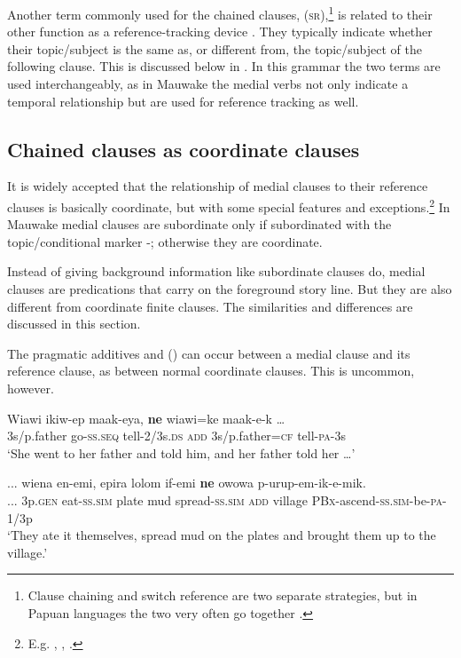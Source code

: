 Another term commonly used for the chained clauses,  (\textsc{sr}),\footnote{Clause chaining and switch reference are two separate strategies, but in Papuan languages the two very often  go together \citep[104]{Roberts1997}.} is related to their other function as a reference-tracking device \citep[ix]{HaimanEtAl1983}. They typically indicate whether their topic/subject is the same as, or different from, the topic/subject of the following clause. This is discussed below in . In this grammar the two terms are used interchangeably, as in Mauwake the medial verbs not only indicate a temporal relationship but are used for reference tracking as well.

\subsection{Chained clauses as coordinate clauses} \label{sec:8.2.1}

It is widely accepted that the relationship of medial clauses to their reference clauses is basically coordinate, but with some special features and exceptions.\footnote{E.g. \citet[175,193]{Reesink1987}, \citet[51]{Roberts1988a}, \citet[13]{Roberts1994}.} In Mauwake medial clauses are subordinate only if subordinated with the topic/conditional marker -; otherwise they are coordinate. 

Instead of giving background information like subordinate clauses do, medial clauses are predications that carry on the foreground story line. But they are also different from coordinate finite clauses. The similarities and differences are discussed in this section.

The pragmatic additives  and  () can occur between a medial clause and its reference clause, as between normal coordinate clauses. This is uncommon, however.

\ea%
\label{ex:8:x1444}
\gll Wiawi  ikiw-ep  maak-eya,  \textbf{ne}  wiawi=ke  maak-e-k  {\dots} \\
3s/p.father  go-\textsc{ss}.\textsc{seq} tell-2/3s.\textsc{ds} \textsc{add}  3s/p.father=\textsc{cf} tell-\textsc{pa}-3s\\
\glt`She went to her father and told him, and her father told her {\dots}'
\z


\ea%
\label{ex:8:x1445}
\gll ...  wiena  en-emi,  epira  lolom  if-emi  \textbf{ne}  owowa p-urup-em-ik-e-mik.\\
...  3p.\textsc{gen} eat-\textsc{ss}.\textsc{sim} plate  mud  spread-\textsc{ss}.\textsc{sim} \textsc{add} village \textsc{PBx}-ascend-\textsc{ss}.\textsc{sim}-be-\textsc{pa}-1/3p\\
\glt`They ate it themselves, spread mud on the plates and brought them up to the village.'
\z


